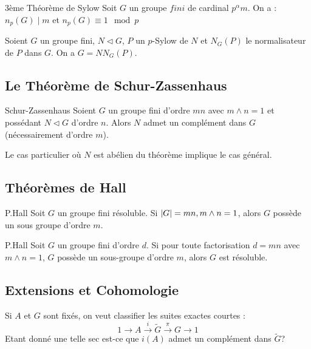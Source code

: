 \documentclass{cours}
\begin{document}
\begin{théorème}{3ème Théorème de Sylow}
    Soit $G$ un groupe $fini$ de cardinal $p^{\alpha}m$. On a : $n_{p}(G) \mid m$ et $ n_{p}(G) \equiv 1 \mod p$
\end{théorème}

\begin{lemma}[Frattini]
    Soient $G$ un groupe fini, $N \lhd G$, $P$ un $p$-Sylow de $N$ et $N_{G}(P)$ le normalisateur de $P$ dans $G$. On a $G = N N_{G}(P)$.
\end{lemma}

\subsection{Le Théorème de Schur-Zassenhaus}
\begin{théorème}{Schur-Zassenhaus}{}
    Soient $G$ un groupe fini d'ordre $mn$ avec $m\wedge n = 1$ et possédant $N \lhd G$ d'ordre $n$. Alors $N$ admet un complément dans $G$ (nécessairement d'ordre $m$).
\end{théorème}

\begin{lemma}
    Le cas particulier où $N$ est abélien du théorème implique le cas général.
\end{lemma}

\subsection{Théorèmes de Hall}
\begin{théorème}{P.Hall}{}
    Soit $G$ un groupe fini résoluble. Si $\left|G\right| = mn, m\land n = 1$, alors $G$ possède un sous groupe d'ordre $m$.
\end{théorème}

\begin{théorème}{P.Hall}{}
    Soit $G$ un groupe fini d'ordre $d$. Si pour toute factorisation $d = mn$ avec $m\land n = 1$, $G$ possède un sous-groupe d'ordre $m$, alors $G$ est résoluble.
\end{théorème}

\subsection{Extensions et Cohomologie}
Si $A$ et $G$ sont fixés, on veut classifier les suites exactes courtes :
\begin{equation}\label{Extension}
    1 \rightarrow A \xrightarrow{i} \tilde{G} \xrightarrow{\pi} G \rightarrow 1
\end{equation}
Etant donné une telle sec est-ce que $i(A)$ admet un complément dans $\tilde{G}$?
\end{document}
